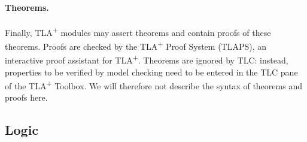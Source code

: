 \documentclass[11pt,fleqn]{article}
\newcommand{\tlaplus}{TLA\textsuperscript{+}\xspace}
\begin{document}
\paragraph{Theorems.}

Finally, \tlaplus modules may assert theorems and contain proofs of these
theorems. Proofs are checked by the \tlaplus Proof System (TLAPS), an
interactive proof assistant for \tlaplus. Theorems are ignored by TLC: instead,
properties to be verified by model checking need to be entered in the TLC pane
of the \tlaplus Toolbox. We will therefore not describe the syntax of theorems
and proofs here.


\subsection{Logic}
\end{document}

